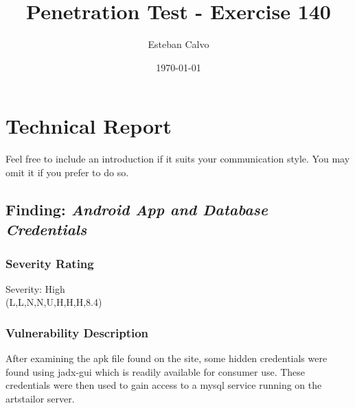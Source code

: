 \documentclass[notitlepage]{article}
\begin{document}
  
\title{Penetration Test - Exercise 140}
\author{Esteban Calvo}
\date{\isodate\today}

\maketitle

\tableofcontents

\newpage

\section{Technical Report}

Feel free to include an introduction if it suits your communication style.
You may omit it if you prefer to do so.


  \subsection{Finding: \emph{Android App and Database Credentials}}
  
	\subsubsection*{Severity Rating}
        Severity: High \\	   	
		\cvss(L,L,N,N,U,H,H,H,8.4)
		
  	\subsubsection*{Vulnerability Description}
  		After examining the apk file found on the site, some hidden credentials were found using jadx-gui
        which is readily available for consumer use. These credentials were then used to gain access to a mysql
        service running on the artstailor server.
\end{document}

